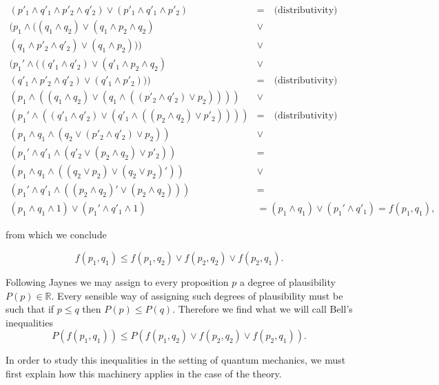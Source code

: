 \begin{align}
(p'_1\wedge q'_1\wedge  p'_2 \wedge q'_2)\vee (p'_1\wedge q'_1\wedge  p'_2 )&= \quad\text{(distributivity)} \\\nonumber
(p_1\wedge((q_1 \wedge q_2)\vee( q_1\wedge  p_2\wedge q_2)&\vee \\\nonumber
(q_1\wedge  p'_2 \wedge q'_2)\vee ( q_1\wedge  p_2))) & \vee\\\nonumber
(p_1'\wedge((q'_1 \wedge q'_2)\vee (q'_1\wedge  p_2\wedge q_2)&\vee \\\nonumber
(q'_1\wedge  p'_2 \wedge q'_2)\vee (q'_1\wedge  p'_2 ))) &= \quad\text{(distributivity)}\\\nonumber
(p_1\wedge((q_1 \wedge q_2)\vee (q_1\wedge(( p'_2 \wedge q'_2)\vee p_2))))&\vee \\\nonumber
(p_1'\wedge((q'_1 \wedge q'_2)\vee (q'_1\wedge ((p_2\wedge q_2)\vee p'_2) )))&= \quad\text{(distributivity)}\\\nonumber
(p_1\wedge q_1\wedge (q_2\vee ( p'_2 \wedge q'_2)\vee p_2))&\vee \\\nonumber
(p_1'\wedge q'_1 \wedge (q'_2 \vee (p_2\wedge q_2) \vee p'_2) )&= \\ \nonumber
(p_1\wedge q_1\wedge ((q_2 \vee p_2) \vee (q_2 \vee p_2)'))&\vee \\\nonumber
(p_1'\wedge q'_1 \wedge ((p_2\wedge q_2)'\vee (p_2\wedge q_2)) )&= \\\nonumber
(p_1\wedge q_1\wedge 1)\vee (p_1'\wedge q'_1 \wedge 1)&= (p_1\wedge q_1)\vee (p_1'\wedge q'_1)=f(p_1,q_1),\nonumber
\end{align}
 
    
from which we conclude 

\begin{equation}
f(p_1,q_1)\leq f(p_1,q_2)\vee f(p_2,q_2)\vee f(p_2,q_1). 
\end{equation}

Following Jaynes \cite{Jaynes2003} we may assign to every proposition $p$ a degree of plausibility $P(p)\in\mathbb{R}$. Every sensible way of assigning such degrees of plausibility must be such that if $p\leq q$ then $P(p)\leq P(q)$. Therefore we find what we will call Bell's inequalities
\begin{equation}
P(f(p_1,q_1))\leq P(f(p_1,q_2)\vee f(p_2,q_2)\vee f(p_2,q_1)). 
\end{equation}

In order to study this inequalities in the setting of quantum mechanics, we must first explain how this machinery applies in the case of the theory.

